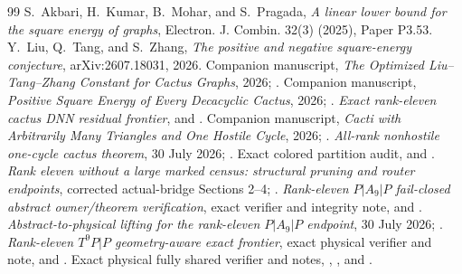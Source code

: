 \documentclass[11pt]{article}
\theoremstyle{remark}
\begin{document}
\begin{thebibliography}{99}
 S.~Akbari, H.~Kumar, B.~Mohar, and S.~Pragada,
\emph{A linear lower bound for the square energy of graphs}, Electron. J.
Combin. 32(3) (2025), Paper P3.53.
 Y.~Liu, Q.~Tang, and S.~Zhang,
\emph{The positive and negative square-energy conjecture}, arXiv:2607.18031,
2026.
 Companion manuscript, \emph{The Optimized Liu--Tang--Zhang
Constant for Cactus Graphs}, 2026; .
 Companion manuscript, \emph{Positive Square Energy of Every
Decacyclic Cactus}, 2026; .
 \emph{Exact rank-eleven cactus DNN residual frontier},
 and
.
 Companion manuscript, \emph{Cacti with Arbitrarily Many
Triangles and One Hostile Cycle}, 2026;
.
 \emph{All-rank nonhostile one-cycle cactus theorem},
30 July 2026;
.
 Exact colored partition audit,
 and
.
 \emph{Rank eleven without a large marked census: structural
pruning and router endpoints}, corrected actual-bridge Sections 2--4;
.
 \emph{Rank-eleven $P|A_9|P$ fail-closed abstract
owner/theorem verification}, exact verifier and integrity note,
 and
.
 \emph{Abstract-to-physical lifting for the rank-eleven
$P|A_9|P$ endpoint}, 30 July 2026;
.
 \emph{Rank-eleven $T^9P|P$ geometry-aware exact frontier},
exact physical verifier and note,
 and
.
 Exact physical fully shared verifier and notes,
,
, and
.
\end{thebibliography}
\end{document}
